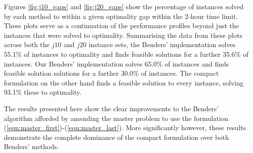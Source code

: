 \documentclass[a4paper,abstracton]{scrartcl}
\begin{document}
Figures \ref{fig:j10_gaps} and \ref{fig:j20_gaps} show the percentage of instances solved by each method to within a given optimality gap within the 2-hour time limit. These plots serve as a continuation of the performance profiles beyond just the instances that were solved to optimality. Summarising the data from these plots across both the $j10$ and $j20$ instance sets, the \cite{balouka2021robust} Benders' implementation solves 55.1\% of instances to optimality and finds feasible solutions for a further 35.6\% of instances. Our Benders' implementation solves 65.0\% of instances and finds feasible solution solutions for a further 30.0\% of instances. The compact formulation on the other hand finds a feasible solution to every instance, solving 93.1\% these to optimality.

The results presented here show the clear improvements to the Benders' algorithm afforded by amending the master problem to use the formulation (\ref{eqn:master_first})-(\ref{eqn:master_last}). More significantly however, these results demonstrate the complete dominance of the compact formulation over both Benders' methods.
\end{document}
